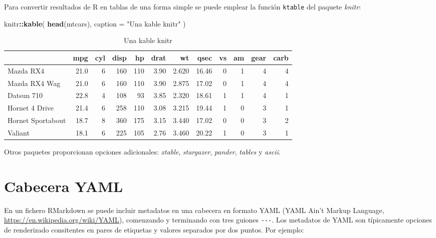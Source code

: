 \documentclass[]{book}
\newenvironment{Shaded}{\begin{snugshade}}{\end{snugshade}}
\newcommand{\KeywordTok}[1]{\textcolor[rgb]{0.13,0.29,0.53}{\textbf{#1}}}
\newcommand{\DataTypeTok}[1]{\textcolor[rgb]{0.13,0.29,0.53}{#1}}
\newcommand{\StringTok}[1]{\textcolor[rgb]{0.31,0.60,0.02}{#1}}
\newcommand{\OperatorTok}[1]{\textcolor[rgb]{0.81,0.36,0.00}{\textbf{#1}}}
\newcommand{\NormalTok}[1]{#1}
\theoremstyle{definition}
\theoremstyle{definition}
\theoremstyle{definition}
\theoremstyle{remark}
\begin{document}
Para convertir resultados de R en tablas de una forma simple se puede
emplear la función \texttt{ktable} del paquete \emph{knitr}:

\begin{Shaded}
\begin{Highlighting}[]
\NormalTok{knitr}\OperatorTok{::}\KeywordTok{kable}\NormalTok{(}
  \KeywordTok{head}\NormalTok{(mtcars), }
  \DataTypeTok{caption =} \StringTok{"Una kable knitr"}
\NormalTok{)}
\end{Highlighting}
\end{Shaded}

\begin{table}

\caption{\label{tab:kable}Una kable knitr}
\centering
\begin{tabular}[t]{l|r|r|r|r|r|r|r|r|r|r|r}
\hline
  & mpg & cyl & disp & hp & drat & wt & qsec & vs & am & gear & carb\\
\hline
Mazda RX4 & 21.0 & 6 & 160 & 110 & 3.90 & 2.620 & 16.46 & 0 & 1 & 4 & 4\\
\hline
Mazda RX4 Wag & 21.0 & 6 & 160 & 110 & 3.90 & 2.875 & 17.02 & 0 & 1 & 4 & 4\\
\hline
Datsun 710 & 22.8 & 4 & 108 & 93 & 3.85 & 2.320 & 18.61 & 1 & 1 & 4 & 1\\
\hline
Hornet 4 Drive & 21.4 & 6 & 258 & 110 & 3.08 & 3.215 & 19.44 & 1 & 0 & 3 & 1\\
\hline
Hornet Sportabout & 18.7 & 8 & 360 & 175 & 3.15 & 3.440 & 17.02 & 0 & 0 & 3 & 2\\
\hline
Valiant & 18.1 & 6 & 225 & 105 & 2.76 & 3.460 & 20.22 & 1 & 0 & 3 & 1\\
\hline
\end{tabular}
\end{table}

Otros paquetes proporcionan opciones adicionales: \emph{xtable},
\emph{stargazer}, \emph{pander}, \emph{tables} y \emph{ascii}.

\section{Cabecera YAML}\label{yaml}

En un fichero RMarkdown se puede incluir metadatos en una cabecera en
formato YAML (YAML Ain't Markup Language,
\url{https://en.wikipedia.org/wiki/YAML}), comenzando y terminando con
tres guiones \texttt{-\/-\/-}. Los metadatos de YAML son típicamente
opciones de renderizado consitentes en pares de etiquetas y valores
separados por dos puntos. Por ejemplo:
\end{document}
